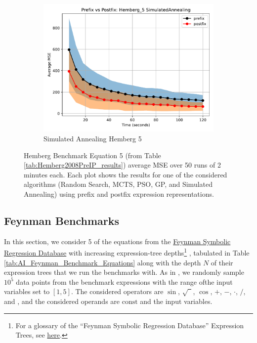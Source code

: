 \documentclass[runningheads]{llncs}
\newcommand\specialcaret{%
  \stackengine{0pt}{\ \,}{\scalebox{1.1}[2]{\raisebox{-0.9ex}{\string^}}}{O}{c}{F}{T}{L}}
\begin{document}
\begin{figure}
    \vspace{0.5cm}
    
    \begin{subfigure}[b]{0.4\textwidth}
        \includegraphics[width=\linewidth, keepaspectratio]{Hemberg_Benchmarks/PrePostHemberg_5SimulatedAnnealing.pdf}
        \caption{Simulated Annealing Hemberg 5}
        \label{subfig:hemberg_5_SA}
    \end{subfigure}
    
    \caption{Hemberg Benchmark Equation 5 (from Table \ref{tab:Hemberg2008PreIP_results}) average MSE over 50 runs of 2 minutes each. Each plot shows the results for one of the considered algorithms (Random Search, MCTS, PSO, GP, and Simulated Annealing) using prefix and postfix expression representations.}
    \label{fig:Hemberg_5_Benchmarks}
\end{figure}

\subsection{Feynman Benchmarks} \label{subsec:FeynmanBenchmarks}
In this section, we consider 5 of the equations from the \href{https://space.mit.edu/home/tegmark/aifeynman.html}{Feynman Symbolic Regression Database} with increasing expression-tree depths\footnote{For a glossary of the ``Feynman Symbolic Regression Database'' Expression Trees, see \href{https://edfink234.github.io/AIFeynmanExpressionTrees/AIFeynmanExpressionTrees/AIFeynmanExpressionTrees}{here}.} 
, tabulated in Table \ref{tab:AI_Feynman_Benchmark_Equations} along with the depth $N$ of their expression trees that we run the benchmarks with. As in \cite{udrescu2020ai}, we randomly sample $10^5$ data points from the benchmark expressions with the range ofthe input variables set to $[1, 5]$. The considered operators are $\sin$, $\sqrt{\phantom{1}}$, $\cos$, $+$, $-$, $\cdot$, $/$, and \specialcaret, and the considered operands are $\mathrm{const}$ and the input variables. 
\end{document}

